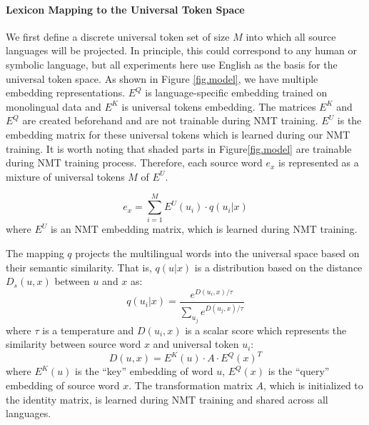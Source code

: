 \paragraph{Lexicon Mapping to the Universal Token Space}
We first define a discrete universal token set of size $M$ into which all source languages will be projected. In principle, this could correspond to any human or symbolic language, but all experiments here use English as the basis for the universal token space. As shown in Figure \ref{fig.model}, we have multiple embedding representations. $E^Q$ is language-specific embedding trained on  monolingual data and $E^K$ is universal tokens embedding. The matrices $E^K$ and $E^Q$ are created beforehand and are not trainable during NMT training.  $E^U$ is the embedding matrix for these universal tokens which is learned during  our NMT training.  It is worth noting that shaded parts in Figure\ref{fig.model} are trainable during  NMT training process.
Therefore, each source word  $e_x$ is represented as a mixture of universal tokens $M$ of $E^U$.

\begin{equation}
	e_x = \sum_{i=1}^M E^U\left(u_i\right) \cdot q(u_i|x)
    \label{eq.universal_embed}
\end{equation}
where $E^U$ is an NMT embedding matrix, which is learned during NMT training.



The mapping $q$ projects the multilingual words into the universal space based on their semantic similarity. That is, $q(u|x)$ is a distribution based on the distance $D_s(u, x)$ between $u$ and $x$ as:
\begin{equation}
 q(u_i|x) = \frac{e^{D(u_i, x) / \tau}}{\sum_{u_j} e^{D(u_j, x) / \tau}}
 \label{eq.q_softmax}
\end{equation}
where $\tau$ is a temperature and $D(u_i, x)$ is a scalar score which represents the similarity between source word $x$ and universal token $u_i$:
\begin{equation}
\label{eq.ds}
	D(u, x) =  E^K(u)\cdot A\cdot E^Q(x)^T
\end{equation}
where $E^K(u)$ is the ``key'' embedding of word $u$, $E^Q(x)$ is the ``query'' embedding of source word $x$.  The transformation matrix $A$, which is initialized to the identity matrix, is learned during NMT training and shared across all languages. 

